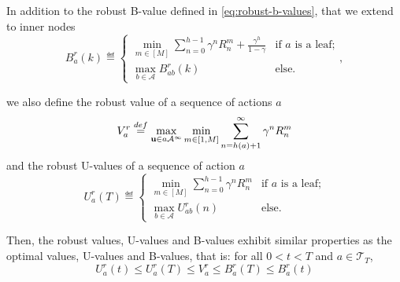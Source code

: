 \documentclass{article}
\begin{document}
\begin{lemma}
	In addition to the robust B-value defined in \eqref{eq:robust-b-values}, that we extend to inner nodes	
	\begin{equation}
	\label{eq:br}
	B_a^r(k)  \eqdef
	\begin{cases}
	\min_{m\in[M]} \sum_{n=0}^{h-1} \gamma^n R_n^m  + \frac{\gamma^h}{1-\gamma}&\text{if } a \text{ is a leaf;}\\
	\max_{b\in\mathcal{A}} B_{ab}^r(k) & \text{else.}
	\end{cases},
	\end{equation}
	
	we also define the robust value of a sequence of actions $a$
	\begin{equation}
	\label{eq:max_vr}
	V_a^r \stackrel{def}{=} \max_{\mathbf{u} \in a\mathcal{A^\infty}} \min_{m\in[1, M]} \sum_{n=h(a)+1}^\infty \gamma^n R^m_n
	\end{equation}
	and the robust U-values of a sequence of action $a$
	\begin{equation}
	\label{eq:ur}
	U_a^r(T)  \eqdef
	\begin{cases}
	\min_{m\in[M]} \sum_{n=0}^{h-1} \gamma^n R_n^m &\text{if } a \text{ is a leaf;}\\
	\max_{b\in\mathcal{A}} U_{ab}^r(n) & \text{else.}
	\end{cases}
	\end{equation}
	
	Then, the robust values, U-values and B-values exhibit similar properties as the optimal values, U-values and B-values, that is: for all $0 < t < T$ and $a\in\mathcal{T}_T$,
	\begin{equation}
	U^r_a(t) \leq U^r_a(T) \leq V^r_a \leq B^r_a(T) \leq B^r_a(t)
	\end{equation}
	\label{lemma:uvb}
\end{lemma}
\end{document}
